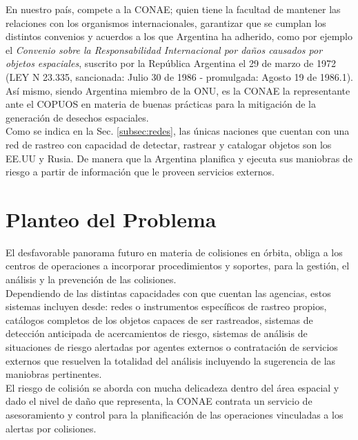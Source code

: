 En nuestro pa\'is, compete a la CONAE; quien tiene la facultad de mantener las relaciones con los organismos internacionales, garantizar que se cumplan los distintos convenios y acuerdos a los que Argentina ha adherido, como por ejemplo el {\it{Convenio sobre la Responsabilidad Internacional por da\~nos causados por objetos espaciales}}, suscrito por la Rep\'ublica Argentina el 29 de marzo de 1972 (LEY N 23.335, sancionada: Julio 30 de 1986 - promulgada: Agosto 19 de 1986.1).\\

As\'i mismo, siendo Argentina miembro de la ONU, es la CONAE la representante ante el COPUOS en materia de buenas pr\'acticas para la mitigaci\'on de la generaci\'on de desechos espaciales.\\

Como se indica en la Sec. \ref{subsec:redes}, las \'unicas naciones que cuentan con una red de rastreo con capacidad de detectar, rastrear y catalogar objetos son los EE.UU y Rusia. De manera que la Argentina planifica y ejecuta sus maniobras de riesgo a partir de informaci\'on que le proveen servicios externos.\\

\section{Planteo del Problema}

El desfavorable panorama futuro en materia de colisiones en \'orbita, obliga a los centros de operaciones a incorporar procedimientos y soportes, para la gesti\'on, el an\'alisis y la prevenci\'on de las colisiones.\\

Dependiendo de las distintas capacidades con que cuentan las agencias, estos sistemas incluyen desde: redes o instrumentos espec\'ificos de rastreo propios, cat\'alogos completos de los objetos capaces de ser rastreados, sistemas de detecci\'on anticipada de acercamientos de riesgo, sistemas de an\'alisis de situaciones de riesgo alertadas por agentes externos o contrataci\'on de servicios externos que resuelven la totalidad del an\'alisis incluyendo la sugerencia de las maniobras pertinentes.\\

El riesgo de colisi\'on se aborda con mucha delicadeza dentro del \'area espacial y dado el nivel de da\~no que representa, la CONAE contrata un servicio de asesoramiento y control para la planificaci\'on de las operaciones vinculadas a los alertas por colisiones.\\


